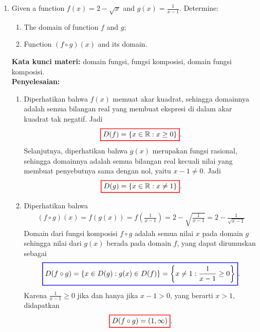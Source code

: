 \documentclass[10pt,openany,a4paper]{article}
\theoremstyle{definition}
\theoremstyle{definition}
\theoremstyle{plain}
\newenvironment{jawab}[2][tes]{
\textbf{Kata kunci materi:} #1.\\
\textbf{Penyelesaian:} #2
}{}
\begin{document}
\begin{enumerate}
    \item Given a function \(f(x) = 2 - \sqrt{x}\) and \(g(x) = \frac{1}{x-1}\). Determine:
    \begin{enumerate}
        \item[a)] The domain of function \(f\) and \(g\);
        \item[b)] Function \((f \circ g)(x)\) and its domain.
    \end{enumerate}
    \begin{jawab}[domain fungsi, fungsi komposisi, domain fungsi komposisi]{
        \begin{enumerate}
            \item Diperhatikan bahwa $f(x)$ memuat akar kuadrat, sehingga domainnya adalah semua bilangan real yang membuat ekspresi di dalam akar kuadrat tak negatif. Jadi 
            \begin{align*}
                \colorlet{oldcolor}{.}
        \color{red}
        \setlength{\fboxrule}{1pt} \boxed{\color{oldcolor}D(f)=\{x \in \mathbb{R} : x \geq 0\}}\color{oldcolor}.
            \end{align*}
            Selanjutnya, diperhatikan bahwa $g(x)$ merupakan fungsi rasional, sehingga domainnya adalah semua bilangan real kecuali nilai yang membuat penyebutnya sama dengan nol, yaitu $x-1\neq 0$. Jadi
            \begin{align*}
                \colorlet{oldcolor}{.}
        \color{red}
        \setlength{\fboxrule}{1pt} \boxed{\color{oldcolor}D(g)=\{x \in \mathbb{R} : x \neq 1\}}\color{oldcolor}.
            \end{align*}
            \item Diperhatikan bahwa 
            \begin{align*}
                (f\circ g)(x) = f(g(x)) = f\left(\frac{1}{x-1}\right) = 2 - \sqrt{\frac{1}{x-1}} = 2 - \frac{1}{\sqrt{x-1}}
            \end{align*}
            Domain dari fungsi komposisi $f\circ g$ adalah semua nilai $x$ pada domain $g$ sehingga nilai dari $g(x)$ berada pada domain $f$, yang dapat dirumuskan sebagai 
            \begin{align*}
                \colorlet{oldcolor}{.}
        \color{blue}
        \setlength{\fboxrule}{1pt} \boxed{\color{oldcolor}D(f\circ g) = \{x \in D(g) : g(x) \in D(f)\} = \left\{x \neq 1 : \frac{1}{x-1} \geq 0\right\}}\color{oldcolor}.
            \end{align*}
            Karena $\frac{1}{x-1} \geq 0$ jika dan hanya jika $x-1 > 0$, yang berarti $x > 1$, didapatkan
            \begin{align*}
                \colorlet{oldcolor}{.}
        \color{red}
        \setlength{\fboxrule}{1pt} \boxed{\color{oldcolor}D(f\circ g) = (1, \infty)}\color{oldcolor}.
            \end{align*}
        \end{enumerate}
    }
        

\end{jawab}
\end{enumerate}
\end{document}
